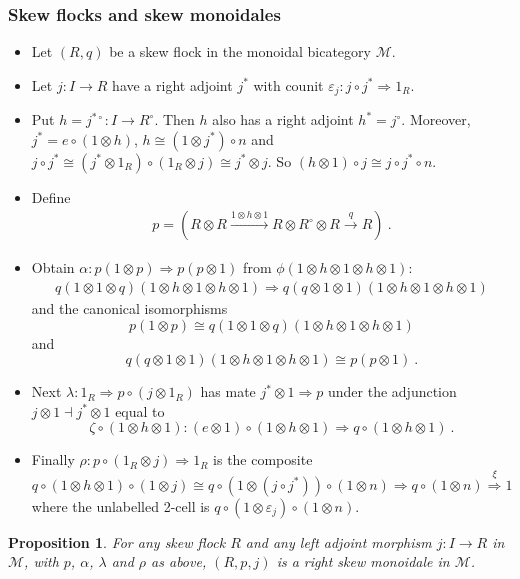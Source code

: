 \documentclass{beamer}
\newcommand{\lra}{\longrightarrow}
\newcommand{\Lra}{\Longrightarrow}
\def\CM{{\mathscr M}}
\newtheorem{proposition}[theorem]{Proposition}
\begin{document}
\begin{frame}
 \frametitle{Skew flocks and skew monoidales}
 \begin{itemize}
 \item Let $(R,q)$ be a skew flock in the monoidal bicategory $\CM$.
 \pause
 \item Let $j : I \lra R$ have a right adjoint $j^*$ with counit $\varepsilon_j : j\circ j^* \Lra 1_R$.
 \pause
\item Put $h = j^{* \circ} : I \lra R^{\circ}$. 
Then $h$ also has a right adjoint $h^* = j^{\circ}$.
Moreover, $j^* = e\circ (1\otimes h)$,  $h \cong (1\otimes j^*)\circ n$
and 
$j \circ j^* \cong (j^* \otimes 1_R)\circ (1_R\otimes j) \cong  j^* \otimes j $.
So $(h\otimes 1)\circ j \cong j\circ j^* \circ n$.
\pause
\item Define
\begin{eqnarray*}
p = (R\otimes R \stackrel{1\otimes h \otimes 1}\lra R\otimes R^{\circ} \otimes R \stackrel{q}\lra R) \ .
\end{eqnarray*}
\pause
\item Obtain $\alpha : p(1\otimes p) \Lra p(p\otimes 1)$ from
$\phi (1\otimes h\otimes 1\otimes h\otimes 1) :$
\begin{eqnarray*}
q(1\otimes 1\otimes q)(1\otimes h\otimes 1\otimes h\otimes 1)
\Lra 
q(q\otimes 1\otimes 1)(1\otimes h\otimes 1\otimes h\otimes 1)
\end{eqnarray*}
and the canonical isomorphisms
$$p(1\otimes p) \cong q(1\otimes 1\otimes q)(1\otimes h\otimes 1\otimes h\otimes 1)$$ and  
$$q(q\otimes 1\otimes 1)(1\otimes h\otimes 1\otimes h\otimes 1) \cong p(p\otimes 1) \ .$$
 \end{itemize}
 \end{frame}
 \begin{frame}
 \begin{itemize}
\item Next $\lambda : 1_R \Lra p\circ (j\otimes 1_R)$ has mate
$j^*\otimes 1 \Lra p$ under the adjunction $j\otimes 1\dashv j^*\otimes 1$ equal to
$$\zeta \circ (1\otimes h\otimes 1) : (e\otimes 1)\circ (1\otimes h\otimes 1) \Lra q\circ (1\otimes h\otimes 1) \ .$$ 
\pause
\item Finally $\rho : p\circ (1_R\otimes j) \Lra 1_R$ is the composite 
$$q\circ (1\otimes h\otimes 1)\circ (1\otimes j)\cong q\circ (1\otimes (j\circ j^*))\circ (1\otimes n) \Lra q\circ (1\otimes n) \stackrel{\xi}\Lra 1 $$
where the unlabelled 2-cell is $q\circ (1\otimes \varepsilon_j)\circ (1\otimes n)$.
\end{itemize}
\pause
\begin{proposition}\label{smfromsf}
For any skew flock $R$ and any left adjoint morphism $j : I \lra R$ in $\CM$, with 
$p$, $\alpha$, $\lambda$ and $\rho$ as above, $(R, p, j)$ is a right skew monoidale in $\CM$.  
\end{proposition}
 \end{frame}
\end{document}
